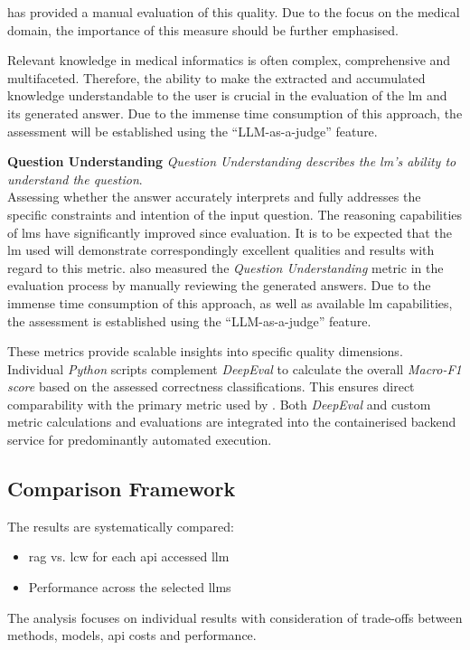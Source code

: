 \citet{Paul_Keller} has provided a manual evaluation of this quality.
Due to the focus on the medical domain, the importance of this measure should be further emphasised. 

Relevant knowledge in medical informatics is often complex, comprehensive and multifaceted.
Therefore, the ability to make the extracted and accumulated knowledge understandable to the user is crucial in the evaluation of the \ac{lm} and its generated answer.
Due to the immense time consumption of this approach, the assessment will be established using the \enquote{LLM-as-a-judge} feature.
%
    
%
\noindent\textbf{Question Understanding}\label{def:qu_understanding_approach}\newline
\textit{Question Understanding describes the \ac{lm}'s ability to understand the question}.\\
Assessing whether the answer accurately interprets and fully addresses the specific constraints and intention of the input question.
The reasoning capabilities of \acp{lm} have significantly improved since \citet{Paul_Keller} evaluation.
It is to be expected that the \ac{lm} used will demonstrate correspondingly excellent qualities and results with regard to this metric.
\citet{Paul_Keller} also measured the \textit{Question Understanding} metric in the evaluation process by manually reviewing the generated answers.
Due to the immense time consumption of this approach, as well as available \ac{lm} capabilities, the assessment is established using the \enquote{LLM-as-a-judge} feature.
    
These metrics provide scalable insights into specific quality dimensions.
Individual \textit{Python} scripts complement \textit{DeepEval} to calculate the overall \textit{Macro-F1 score} based on the assessed correctness classifications.
This ensures direct comparability with the primary metric used by \citet{Paul_Keller}.
Both \textit{DeepEval} and custom metric calculations and evaluations are integrated into the containerised backend service for predominantly automated execution.

\subsection{Comparison Framework}\label{subsec:comparison_approach}
The results are systematically compared: 
\begin{itemize}
    \item \ac{rag} vs. \ac{lcw} for each \ac{api} accessed \ac{llm}
    \item Performance across the selected \acp{llm}
    \end{itemize}
The analysis focuses on individual results with consideration of trade-offs between methods, models, \ac{api} costs and performance.
%
